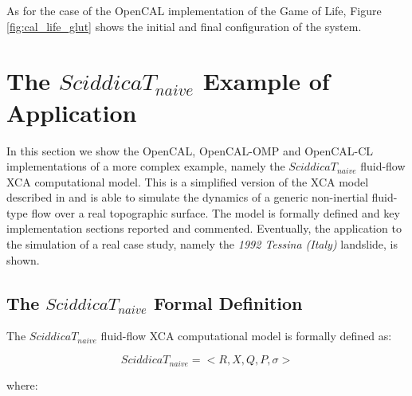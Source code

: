 

As for the case of the OpenCAL implementation of the Game of
Life, Figure \ref{fig:cal_life_glut} shows the initial and final
configuration of the system.


\section{The $SciddicaT_{naive}$ Example of Application}
\label{sec:SciddicaT-naive}

In this section we show the OpenCAL, OpenCAL-OMP and OpenCAL-CL
implementations of a more complex example, namely the
$SciddicaT_{naive}$ fluid-flow XCA computational model. This is a
simplified version of the XCA model described in
\cite{avolio2000simulation} and is able to simulate the dynamics of
a generic non-inertial fluid-type flow over a real topographic
surface. The model is formally defined and key implementation
sections reported and commented. Eventually, the application to the
simulation of a real case study, namely the \textit{1992 Tessina (Italy)}
landslide, is shown.

\subsection{The $SciddicaT_{naive}$ Formal Definition}
\label{sec:sciddicaT_model}
The $SciddicaT_{naive}$ fluid-flow XCA computational model is
formally defined as:

$$SciddicaT_{naive} = < R, X, Q , P, \sigma >$$

where:

